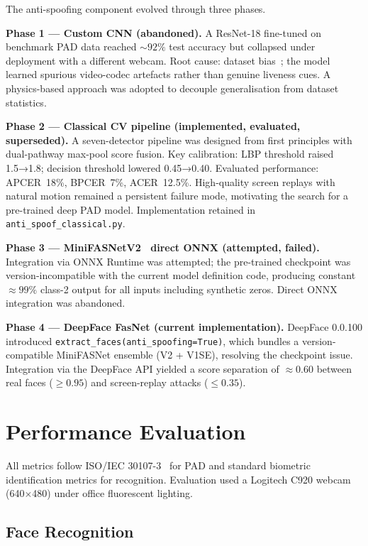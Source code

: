 \documentclass[10pt,a4paper]{article}
\begin{document}
The anti-spoofing component evolved through three phases.

\textbf{Phase 1 --- Custom CNN (abandoned).}
A ResNet-18 fine-tuned on benchmark PAD data reached $\sim\!92\%$ test accuracy but
collapsed under deployment with a different webcam.
Root cause: dataset bias~\cite{boulkenafet2016color}; the model learned spurious
video-codec artefacts rather than genuine liveness cues.
A physics-based approach was adopted to decouple generalisation from dataset statistics.

\textbf{Phase 2 --- Classical CV pipeline (implemented, evaluated, superseded).}
A seven-detector pipeline was designed from first principles with dual-pathway
max-pool score fusion.
Key calibration: LBP threshold raised 1.5→1.8; decision threshold lowered 0.45→0.40.
Evaluated performance: APCER~18\%, BPCER~7\%, ACER~12.5\%.
High-quality screen replays with natural motion remained a persistent failure mode,
motivating the search for a pre-trained deep PAD model.
Implementation retained in \texttt{anti\_spoof\_classical.py}.

\textbf{Phase 3 --- MiniFASNetV2~\cite{liu2021minifasnet} direct ONNX (attempted, failed).}
Integration via ONNX Runtime was attempted; the pre-trained checkpoint was
version-incompatible with the current model definition code, producing constant
$\approx\!99\%$ class-2 output for all inputs including synthetic zeros.
Direct ONNX integration was abandoned.

\textbf{Phase 4 --- DeepFace FasNet (current implementation).}
DeepFace 0.0.100 introduced \texttt{extract\_faces(anti\_spoofing=True)}, which
bundles a version-compatible MiniFASNet ensemble (V2 + V1SE), resolving the
checkpoint issue.
Integration via the DeepFace API yielded a score separation of $\approx\!0.60$
between real faces ($\geq\!0.95$) and screen-replay attacks ($\leq\!0.35$).

\section{Performance Evaluation}
\label{sec:evaluation}

All metrics follow ISO/IEC 30107-3~\cite{iso30107} for PAD and standard biometric
identification metrics for recognition.
Evaluation used a Logitech C920 webcam (640$\times$480) under office fluorescent lighting.

\subsection{Face Recognition}
\end{document}
